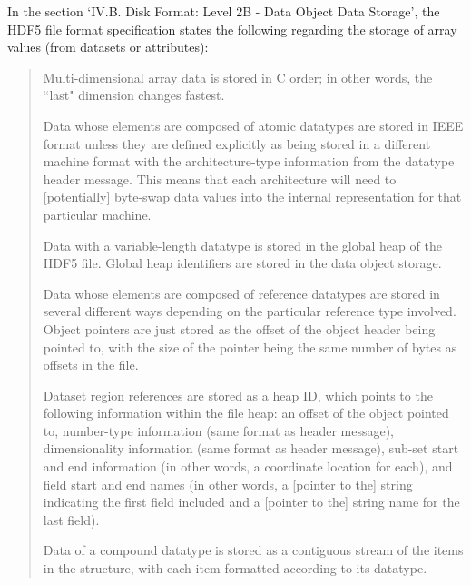 

In the section `IV.B. Disk Format: Level 2B - Data Object Data Storage', the HDF5 file format specification states the following regarding the storage of array values (from datasets or attributes):

\begin{quote}
Multi-dimensional array data is stored in C order; in other words, the ``last" dimension changes fastest.

Data whose elements are composed of atomic datatypes are stored in IEEE format unless they are defined explicitly as being stored in a different machine format with the architecture-type information from the datatype header message. This means that each architecture will need to [potentially] byte-swap data values into the internal representation for that particular machine.

Data with a variable-length datatype is stored in the global heap of the HDF5 file. Global heap identifiers are stored in the data object storage.

Data whose elements are composed of reference datatypes are stored in several different ways depending on the particular reference type involved. Object pointers are just stored as the offset of the object header being pointed to, with the size of the pointer being the same number of bytes as offsets in the file.

Dataset region references are stored as a heap ID, which points to the following information within the file heap: an offset of the object pointed to, number-type information (same format as header message), dimensionality information (same format as header message), sub-set start and end information (in other words, a coordinate location for each), and field start and end names (in other words, a [pointer to the] string indicating the first field included and a [pointer to the] string name for the last field).

Data of a compound datatype is stored as a contiguous stream of the items in the structure, with each item formatted according to its datatype.
\end{quote}


